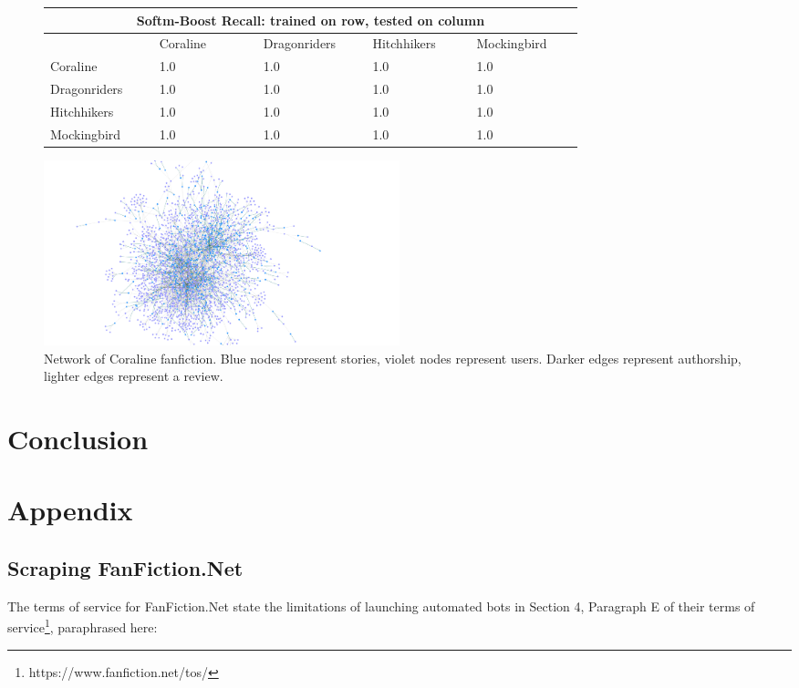 \documentclass[letterpaper]{article}
\begin{document}
\begin{figure}[ht]
\begin{tabular}{|p{0.15\linewidth}|p{0.15\linewidth}|p{0.15\linewidth}|p{0.15\linewidth}|p{0.15\linewidth}|}
\hline
\multicolumn{5}{|c|}{\textbf{Softm-Boost Recall}: trained on row, tested on column}\\
\hline
    & Coraline & Dragonriders & Hitchhikers & Mockingbird \\
    \hline
     Coraline & 1.0 & 1.0 & 1.0 & 1.0 \\
     Dragonriders & 1.0 & 1.0 & 1.0 & 1.0 \\
     Hitchhikers & 1.0 & 1.0 & 1.0 & 1.0 \\
     Mockingbird & 1.0 & 1.0 & 1.0 & 1.0 \\
\hline
\end{tabular}

\end{figure}

\begin{figure}
    \centering
    \includegraphics[width=0.5\textwidth]{Coraline_network.png}
    \caption{Network of Coraline fanfiction. Blue nodes represent stories, violet nodes represent users. Darker edges represent authorship, lighter edges represent a review.}
    \label{fig:my_label}
\end{figure}

\section{Conclusion}

\section{Appendix}

\subsection{Scraping FanFiction.Net}

The terms of service for FanFiction.Net state the limitations of launching automated bots in Section 4, Paragraph E of their terms of service\footnote{https://www.fanfiction.net/tos/}, paraphrased here:
\end{document}
